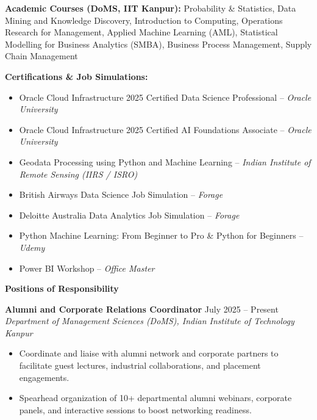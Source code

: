 \documentclass[10pt]{article}
\begin{document}
\vspace{4pt}

\textbf{Academic Courses (DoMS, IIT Kanpur):} Probability \& Statistics, Data Mining and Knowledge Discovery, Introduction to Computing, Operations Research for Management, Applied Machine Learning (AML), Statistical Modelling for Business Analytics (SMBA), Business Process Management, Supply Chain Management

\vspace{4pt}

\textbf{Certifications \& Job Simulations:}
\begin{itemize}[noitemsep, topsep=1.5pt, partopsep=0pt, parsep=1pt]
    \item Oracle Cloud Infrastructure 2025 Certified Data Science Professional -- \textit{Oracle University}
    \item Oracle Cloud Infrastructure 2025 Certified AI Foundations Associate -- \textit{Oracle University}
    \item Geodata Processing using Python and Machine Learning -- \textit{Indian Institute of Remote Sensing (IIRS / ISRO)}
    \item British Airways Data Science Job Simulation -- \textit{Forage}
    \item Deloitte Australia Data Analytics Job Simulation -- \textit{Forage}
    \item Python Machine Learning: From Beginner to Pro \& Python for Beginners -- \textit{Udemy}
    \item Power BI Workshop -- \textit{Office Master}
\end{itemize}

\vspace{8pt}

\begin{center}
    \textbf{Positions of Responsibility}
\end{center}
\vspace{-4pt}

\textbf{Alumni and Corporate Relations Coordinator} \hfill July 2025 -- Present\\
\textit{Department of Management Sciences (DoMS), Indian Institute of Technology Kanpur}
\begin{itemize}[noitemsep, topsep=1.5pt, partopsep=0pt, parsep=1pt]
    \item Coordinate and liaise with alumni network and corporate partners to facilitate guest lectures, industrial collaborations, and placement engagements.
    \item Spearhead organization of 10+ departmental alumni webinars, corporate panels, and interactive sessions to boost networking readiness.
\end{itemize}
\end{document}
